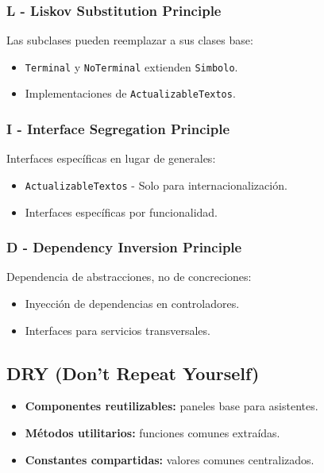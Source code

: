 \subsubsection{L - Liskov Substitution Principle}

Las subclases pueden reemplazar a sus clases base:
\begin{itemize}
    \item \texttt{Terminal} y \texttt{NoTerminal} extienden \texttt{Simbolo}.
    \item Implementaciones de \texttt{ActualizableTextos}.
\end{itemize}

\subsubsection{I - Interface Segregation Principle}

Interfaces específicas en lugar de generales:
\begin{itemize}
    \item \texttt{ActualizableTextos} - Solo para internacionalización.
    \item Interfaces específicas por funcionalidad.
\end{itemize}

\subsubsection{D - Dependency Inversion Principle}

Dependencia de abstracciones, no de concreciones:
\begin{itemize}
    \item Inyección de dependencias en controladores.
    \item Interfaces para servicios transversales.
\end{itemize}

\subsection{DRY (Don't Repeat Yourself)}

\begin{itemize}
    \item \textbf{Componentes reutilizables:} paneles base para asistentes.
    \item \textbf{Métodos utilitarios:} funciones comunes extraídas.
    \item \textbf{Constantes compartidas:} valores comunes centralizados.
\end{itemize}

